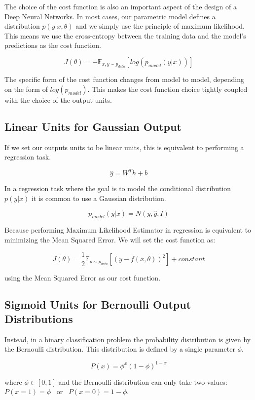 The choice of the cost function is also an important aspect of the design of a Deep Neural Networks. In most cases, our parametric model defines a distribution $ p( y \vert x, \theta)$ and we simply use the principle of maximum likelihood. This means we use the cross-entropy between the training data and the model’s predictions as the cost function.

$$ J(\theta) = - \mathbb{E}_{x, y \sim p_{data}} \left[  log (p_{model} (y \vert x))  \right] $$

\noindent The specific form of the cost function changes from model to model, depending on the form of $log (p_{model})$. This makes the cost function choice tightly coupled with the choice of the output units.

\subsection{Linear Units for Gaussian Output}

If we set our outputs units to be linear units, this is equivalent to performing a regression task.

$$ \hat{y} = W^{T}h + b $$

\noindent In a regression task where the goal is to model the conditional distribution $p(y | x)$ it is common to use a Gaussian distribution.

$$ p_{model} (y \vert x) = N(y, \hat{y}, I)  $$

\noindent Because performing Maximum Likelihood Estimator in regression is equivalent to minimizing the Mean Squared Error. We will set the cost function as:

$$ J(\theta) = \frac{1}{2} \mathbb{E}_{p \sim p_{data}} \left[ ( y - f(x, \theta) )^2  \right] + constant  $$

using the Mean Squared Error as our cost function.

\newpage
\subsection{Sigmoid Units for Bernoulli Output Distributions}

Instead, in a binary classification problem the probability distribution is given by the Bernoulli distribution. This distribution is defined by a single parameter $\phi$.

$$P(x) = \phi^{x} \left(1 - \phi\right)^{1-x} $$

where  $\phi \in [0 ,1]$ and the Bernoulli distribution can only take two values: $P(x=1)=\phi$~ or ~$P(x=0)=1 - \phi$.

